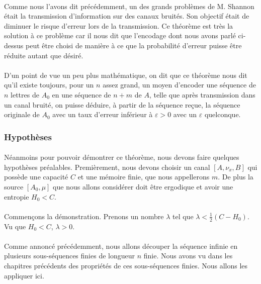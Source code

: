 	\paragraph{}
	Comme nous l'avons dit précédemment, un des grands problèmes de M. Shannon était la transmission d'information sur des
	canaux bruités. Son objectif était de diminuer le risque d'erreur lors de la transmission. Ce théorème est très
	la solution à ce problème car il nous dit que l'encodage dont nous avons parlé ci-dessus peut être choisi 
	de manière à ce que la probabilité d'erreur puisse être réduite autant que désiré.

	\paragraph{}
	D'un point de vue un peu plus mathématique, on dit que 
	ce théorème nous dit qu'il existe toujours, pour un $n$ assez grand, un moyen d'encoder une séquence de $n$ lettres
	de $A_0$ en une séquence de $n+m$ de $A$, telle que après transmission dans un canal bruité, on puisse déduire, 
	à partir de la séquence reçue, la séquence originale de $A_0$ avec un taux d'erreur inférieur à $\varepsilon >0$ avec un $\varepsilon$
	quelconque.
	
\subsubsection*{Hypothèses}
	
	\paragraph{}
	Néanmoins pour pouvoir démontrer ce théorème, nous devons faire quelques hypothèses préalables. Premièrement, nous devons choisir un
	canal $[A,\nu_x,B]$ qui possède une capacité $C$ et une mémoire finie, que nous appellerons $m$.
	De plus la source $[A_0,\mu]$ que nous allons considérer doit être ergodique et avoir une entropie $H_0 < C$.


	\paragraph{}
	Commençons la démonstration. Prenons un nombre $\lambda$ tel que $\lambda<\frac{1}{2}(C-H_0)$. Vu que $H_0 < C$, $\lambda>0$. 
	
	\paragraph{}
	Comme annoncé précédemment, nous allons découper la séquence infinie en plusieurs sous-séquences finies de longueur 
	$n$ finie. Nous avons vu dans les chapitres précédents des propriétés de ces sous-séquences finies. Nous allons les appliquer ici.

